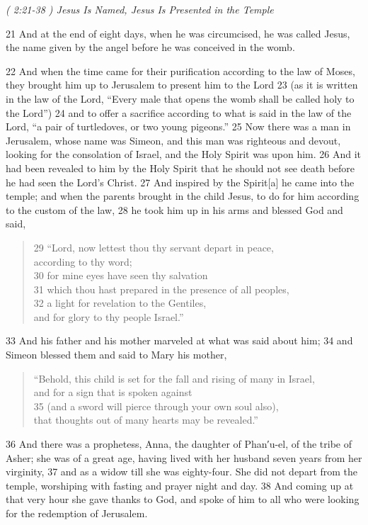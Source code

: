 \documentclass[letterpaper]{report}
\begin{document}
{\centering
	\emph{( 2:21-38 ) Jesus Is Named, Jesus Is Presented in the Temple}\\
}
\begin{multicols}{2}
21 And at the end of eight days, when he was circumcised, he was called Jesus, the name given by the angel before he was conceived in the womb.

22 And when the time came for their purification according to the law of Moses, they brought him up to Jerusalem to present him to the Lord 23 (as it is written in the law of the Lord, “Every male that opens the womb shall be called holy to the Lord”) 24 and to offer a sacrifice according to what is said in the law of the Lord, “a pair of turtledoves, or two young pigeons.” 25 Now there was a man in Jerusalem, whose name was Simeon, and this man was righteous and devout, looking for the consolation of Israel, and the Holy Spirit was upon him. 26 And it had been revealed to him by the Holy Spirit that he should not see death before he had seen the Lord’s Christ. 27 And inspired by the Spirit[a] he came into the temple; and when the parents brought in the child Jesus, to do for him according to the custom of the law, 28 he took him up in his arms and blessed God and said,

\begin{verse}
29 “Lord, now lettest thou thy servant depart in peace,\\
according to thy word;\\
30 for mine eyes have seen thy salvation\\
31 which thou hast prepared in the presence of all peoples,\\
32 a light for revelation to the Gentiles,\\
and for glory to thy people Israel.”\\
\end{verse}

33 And his father and his mother marveled at what was said about him; 34 and Simeon blessed them and said to Mary his mother,

\begin{verse}
“Behold, this child is set for the fall and rising of many in Israel,\\
and for a sign that is spoken against\\
35 (and a sword will pierce through your own soul also),\\
that thoughts out of many hearts may be revealed.”\\
\end{verse}

36 And there was a prophetess, Anna, the daughter of Phan′u-el, of the tribe of Asher; she was of a great age, having lived with her husband seven years from her virginity, 37 and as a widow till she was eighty-four. She did not depart from the temple, worshiping with fasting and prayer night and day. 38 And coming up at that very hour she gave thanks to God, and spoke of him to all who were looking for the redemption of Jerusalem.
\end{multicols}
\end{document}

